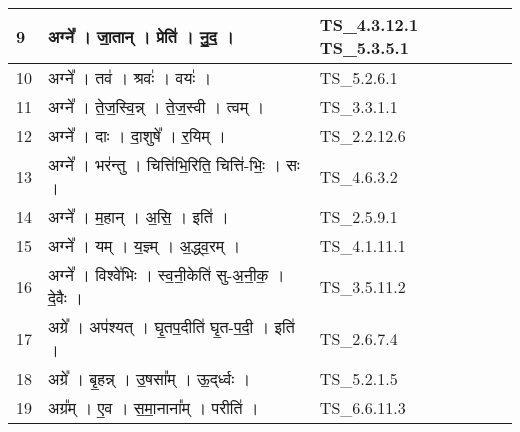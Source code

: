 \documentclass[17pt]{extarticle}
\begin{document}
\begin{longtable}{||p{0.4in}||p{4.9in}||p{0.9in}||}
    \hline
        
    9 & अग्ने᳚   ।   जा॒तान्   ।   प्रेति॑   ।   नु॒द॒   ।    & TS\_4.3.12.1 TS\_5.3.5.1       \\
    
    \hline
        
    10 & अग्ने᳚   ।   तव॑   ।   श्रवः॑   ।   वयः॑   ।    & TS\_5.2.6.1       \\
    
    \hline
        
    11 & अग्ने᳚   ।   ते॒ज॒स्वि॒न्न्   ।   ते॒ज॒स्वी   ।   त्वम्   ।    & TS\_3.3.1.1       \\
    
    \hline
        
    12 & अग्ने᳚   ।   दाः   ।   दा॒शुषे᳚   ।   र॒यिम्   ।    & TS\_2.2.12.6       \\
    
    \hline
        
    13 & अग्ने᳚   ।   भर॑न्तु   ।   चित्ति॑भि॒रिति॒ चित्ति॑{-}भिः॒   ।   सः   ।    & TS\_4.6.3.2       \\
    
    \hline
        
    14 & अग्ने᳚   ।   म॒हान्   ।   अ॒सि॒   ।   इति॑   ।    & TS\_2.5.9.1       \\
    
    \hline
        
    15 & अग्ने᳚   ।   यम्   ।   य॒ज्ञ्म्   ।   अ॒द्ध्व॒रम्   ।    & TS\_4.1.11.1       \\
    
    \hline
        
    16 & अग्ने᳚   ।   विश्वे॑भिः   ।   स्व॒नी॒केति॑ सु{-}अ॒नी॒क॒   ।   दे॒वैः   ।    & TS\_3.5.11.2       \\
    
    \hline
        
    17 & अग्रे᳚   ।   अप॑श्यत्   ।   घृ॒तप॒दीति॑ घृ॒त{-}प॒दी॒   ।   इति॑   ।    & TS\_2.6.7.4       \\
    
    \hline
        
    18 & अग्रे᳚   ।   बृ॒हन्न्   ।   उ॒षसा᳚म्   ।   ऊ॒द्‌र्ध्वः   ।    & TS\_5.2.1.5       \\
    
    \hline
        
    19 & अग्र᳚म्   ।   ए॒व   ।   स॒मा॒नाना᳚म्   ।   परीति॑   ।    & TS\_6.6.11.3       \\
    

\end{longtable}
\end{document}
